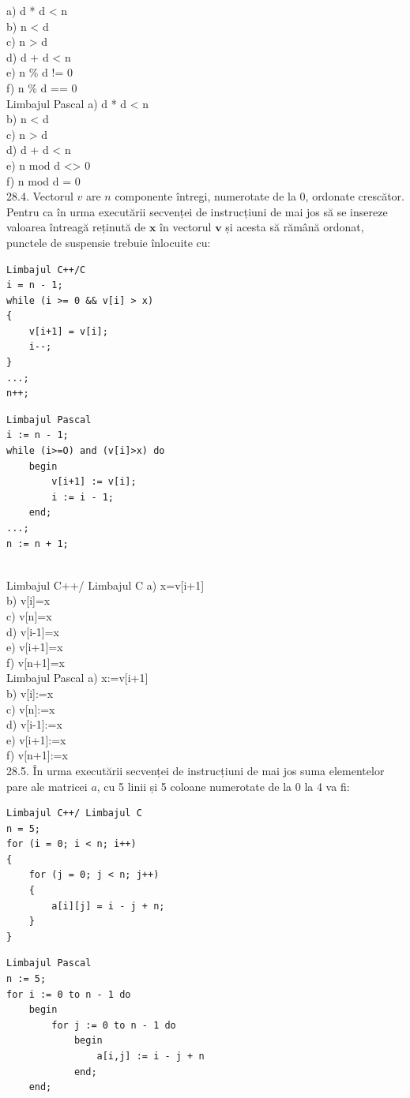 a) d * d < n
\\
b) n < d
\\
c) n > d
\\
d) d + d < n
\\
e) n \% d != 0
\\
f) n \% d == 0
\\
Limbajul Pascal
a) d * d < n
\\
b) n < d
\\
c) n > d
\\
d) d + d < n
\\
e) n mod d <> 0
\\
f) n mod d = 0
\\
28.4. Vectorul $v$ are $n$ componente întregi, numerotate de la 0, ordonate crescător. Pentru ca în urma executării secvenței de instrucțiuni de mai jos să se insereze valoarea întreagă reținută de $\mathbf{x}$ în vectorul $\mathbf{v}$ și acesta să rămână ordonat, punctele de suspensie trebuie înlocuite cu:
\begin{verbatim}
Limbajul C++/C
i = n - 1;
while (i >= 0 && v[i] > x)
{
    v[i+1] = v[i];
    i--;
}
...;
n++;
\end{verbatim}
\begin{verbatim}
Limbajul Pascal
i := n - 1;
while (i>=O) and (v[i]>x) do
    begin
        v[i+1] := v[i];
        i := i - 1;
    end;
...;
n := n + 1;
\end{verbatim}
\\
Limbajul C++/ Limbajul C
a) x=v[i+1]
\\
b) v[i]=x
\\
c) v[n]=x
\\
d) v[i-1]=x
\\
e) v[i+1]=x
\\
f) v[n+1]=x
\\
Limbajul Pascal
a) x:=v[i+1]
\\
b) v[i]:=x
\\
c) v[n]:=x
\\
d) v[i-1]:=x
\\
e) v[i+1]:=x
\\
f) v[n+1]:=x
\\
28.5. În urma executării secvenței de instrucțiuni de mai jos suma elementelor pare ale matricei $a$, cu 5 linii și 5 coloane numerotate de la 0 la 4 va fi:
\begin{verbatim}
Limbajul C++/ Limbajul C
n = 5;
for (i = 0; i < n; i++)
{
    for (j = 0; j < n; j++)
    {
        a[i][j] = i - j + n;
    }
}
\end{verbatim}
\begin{verbatim}
Limbajul Pascal
n := 5;
for i := 0 to n - 1 do
    begin
        for j := 0 to n - 1 do
            begin
                a[i,j] := i - j + n
            end;
    end;
\end{verbatim}
